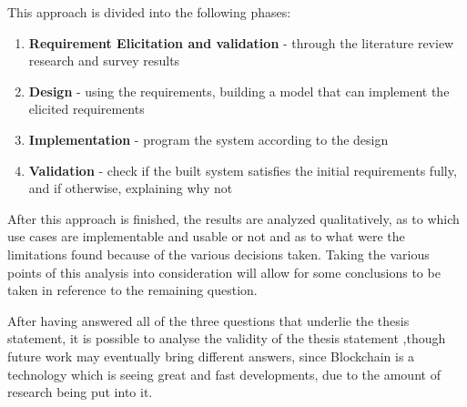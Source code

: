 This approach is divided into the following phases:
\begin{enumerate}
\item \textbf{Requirement Elicitation and validation} - through the literature review research and survey results 
\item \textbf{Design} - using the requirements, building a model that can implement the elicited requirements
\item \textbf{Implementation} - program the system according to the design
\item \textbf{Validation} - check if the built system satisfies the initial requirements fully, and if otherwise, explaining why not
\end{enumerate}

After this approach is finished, the results are analyzed qualitatively, as to which use cases are implementable and usable or not and as to what were the limitations found because of the various decisions taken. Taking the various points of this analysis into consideration will allow for some conclusions to be taken in reference to the remaining question.

After having answered all of the three questions that underlie the thesis statement, it is possible to analyse the validity of the thesis statement ,though future work may eventually bring different answers, since Blockchain is a technology which is seeing great and fast developments, due to the amount of research being put into it.


